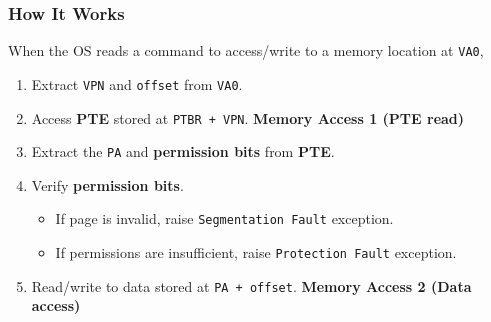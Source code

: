 \documentclass[10pt]{report}
\begin{document}
\subsubsection{How It Works}
When the OS reads a command to access/write to a memory location at \texttt{VA0},
\begin{enumerate}
    \item Extract \texttt{VPN} and \texttt{offset} from \texttt{VA0}.
    \item Access \textbf{PTE} stored at \texttt{PTBR + VPN}. \hfill \textbf{Memory Access 1 (PTE read)}
    \item Extract the \texttt{PA} and \textbf{permission bits} from \textbf{PTE}.
    \item Verify \textbf{permission bits}.
    \begin{itemize}
        \item If page is invalid, raise \texttt{Segmentation Fault} exception.
        \item If permissions are insufficient, raise \texttt{Protection Fault} exception. 
    \end{itemize}
    \item Read/write to data stored at \texttt{PA + offset}. \hfill \textbf{Memory Access 2 (Data access)}
\end{enumerate}
\end{document}
